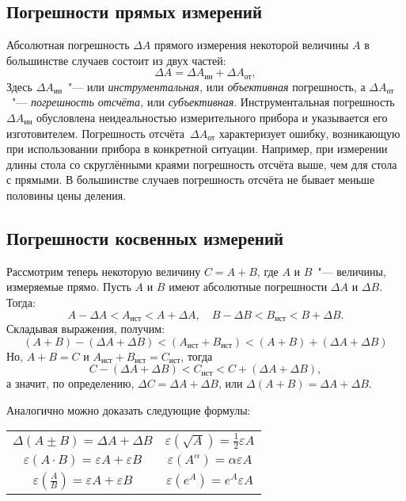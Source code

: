 \documentclass[a4paper,12pt]{article}
\begin{document}
\subsection{Погрешности прямых измерений}
Абсолютная погрешность $\Delta A$ прямого измерения некоторой величины $A$ в большинстве случаев состоит из двух частей:
\begin{equation}
	\Delta A = \Delta A_{\text{ин}} + \Delta A_{\text{от}},
\end{equation}
Здесь $\Delta A_{\text{ин}}$~"--- или \textit{инструментальная,} или \textit{объективная} погрешность, а $\Delta A_{\text{от}}$~"--- \textit{погрешность отсчёта,} или \textit{субъективная}. Инструментальная погрешность~$\Delta A_{\text{ин}}$ обусловлена неидеальностью измерительного прибора и указывается его изготовителем. Погрешность отсчёта~$\Delta A_{\text{от}}$ характеризует ошибку, возникающую при использовании прибора в конкретной ситуации. Например, при измерении длины стола со скруглёнными краями погрешность отсчёта выше, чем для стола с прямыми. В большинстве случаев погрешность отсчёта не бывает меньше половины цены деления.

\subsection{Погрешности косвенных измерений}

Рассмотрим теперь некоторую величину $C = A + B$, где $A$ и $B$~"--- величины, измеряемые прямо. Пусть $A$ и $B$ имеют абсолютные погрешности $\Delta A$ и $\Delta B$. Тогда:
\begin{equation}
	A-\Delta A < A_{\text{ист}} < A+\Delta A, \quad 
		B-\Delta B < B_{\text{ист}} < B+\Delta B.
\end{equation} 
Складывая выражения, получим:
\begin{equation}
	(A+B)-(\Delta A + \Delta B) < (A_{\text{ист}} + B_{\text{ист}}) < (A+B)+(\Delta A + \Delta B)
\end{equation}
Но, $A+B=C$ и $A_{\text{ист}}+B_{\text{ист}}=C_{\text{ист}}$, тогда
\begin{equation}
	C-(\Delta A + \Delta B) < C_{\text{ист}} < C+(\Delta A + \Delta B),
\end{equation}
а значит, по определению, $\Delta C = \Delta A + \Delta B$, или $\Delta (A+B) = \Delta A + \Delta B$.

Аналогично можно доказать следующие формулы:
\begin{center}
	\begin{tabular}{ cc } 
		\hline
		$\Delta(A\pm B) = \Delta A + \Delta B$ & $\varepsilon (\sqrt{A}) = \frac{1}{2}\varepsilon A $ \\ 
		$\varepsilon (A \cdot B) = \varepsilon A + \varepsilon B$ & $\varepsilon (A^\alpha) = \alpha \varepsilon A $  \\ 
		$\varepsilon \left( \frac{A}{B} \right) = \varepsilon A + \varepsilon B$ & $\varepsilon (e^A) = e^A \varepsilon A $\\ 
		\hline
	\end{tabular}
\end{center}
\end{document}
